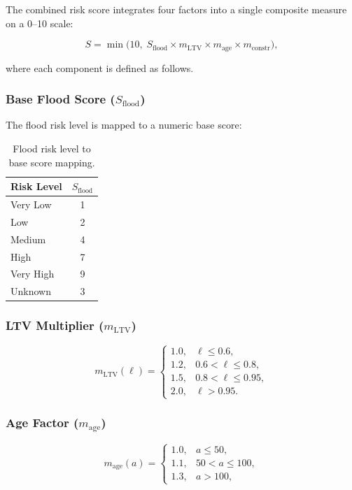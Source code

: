 \documentclass[11pt,a4paper]{article}
\begin{document}
The combined risk score integrates four factors into a single composite measure on a 0--10 scale:

\[
S = \min\!\big(10,\; S_{\text{flood}} \times m_{\text{LTV}} \times m_{\text{age}} \times m_{\text{constr}}\big),
\]

\noindent where each component is defined as follows.

\subsubsection{Base Flood Score ($S_{\text{flood}}$)}

The flood risk level is mapped to a numeric base score:

\begin{table}[H]
\centering
\caption{Flood risk level to base score mapping.}
\label{tab:flood_scores}
\begin{tabular}{lc}
\toprule
\textbf{Risk Level} & $S_{\text{flood}}$ \\
\midrule
Very Low  & 1 \\
Low       & 2 \\
Medium    & 4 \\
High      & 7 \\
Very High & 9 \\
Unknown   & 3 \\
\bottomrule
\end{tabular}
\end{table}

\subsubsection{LTV Multiplier ($m_{\text{LTV}}$)}

\[
m_{\text{LTV}}(\ell) =
\begin{cases}
1.0, & \ell \leq 0.6, \\
1.2, & 0.6 < \ell \leq 0.8, \\
1.5, & 0.8 < \ell \leq 0.95, \\
2.0, & \ell > 0.95.
\end{cases}
\]

\subsubsection{Age Factor ($m_{\text{age}}$)}

\[
m_{\text{age}}(a) =
\begin{cases}
1.0, & a \leq 50, \\
1.1, & 50 < a \leq 100, \\
1.3, & a > 100,
\end{cases}
\]
\end{document}
